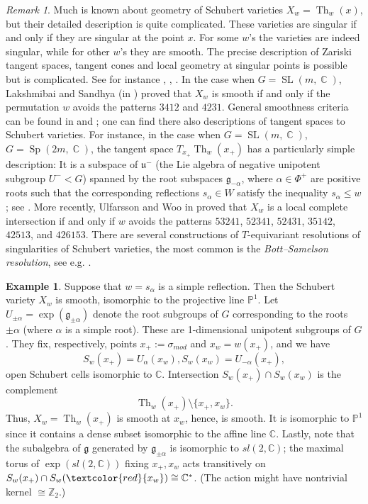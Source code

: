 \documentclass[12pt]{amsbook}%
\theoremstyle{definition}
\newtheorem{example}[thm]{Example}
\theoremstyle{remark}
\newtheorem{rem}[thm]{Remark}
\numberwithin{section}{chapter}
\numberwithin{subsection}{section}
\numberwithin{figure}{chapter}
\DeclareMathOperator{\C}{\mathbb{C}}
\DeclareMathOperator{\SL}{SL}
\DeclareMathOperator{\Sp}{Sp}
\DeclareMathOperator{\Th}{Th}
\def\simod{\sigma_{mod}}
\def\P{{\mathbb{P}}}
\begin{document}
{{\begin{rem}\label{rem:local Schubert} 
Much is known about geometry of Schubert varieties $X_w=\Th_w(x)$, but their detailed description is quite complicated. 
These varieties are singular if and only if they are singular at the point $x$. 
For some $w$'s the varieties are indeed singular, while for other $w$'s they are smooth. 
The precise description of Zariski tangent spaces, tangent cones and local geometry at singular points is possible but is complicated. See for instance \cite{BL}, \cite{CK}, \cite{Ulfarsson-Woo}. In the case when $G=\SL(m,\C)$, Lakshmibai and Sandhya (in \cite{MR1051089}) proved that $X_w$ is 
smooth if and only if the permutation $w$ avoids the patterns  $3412$ and $4231$. General smoothness criteria can be found in 
\cite{BL} and \cite{CK}; one can find there also descriptions of tangent spaces to Schubert varieties. For instance, in the case when $G=\SL(m,\C)$, 
$G=\Sp(2m,\C)$, the tangent space $T_{x_+}\Th_w(x_+)$ has a particularly simple description: It is a subspace of ${\mathfrak u}^-$ (the Lie algebra of negative unipotent subgroup $U^-< G$) spanned by the root subspaces ${\mathfrak g}_{-\alpha}$, where $\alpha\in \Phi^+$ are positive  roots such that the corresponding reflections $s_\alpha\in W$ satisfy the inequality $s_\alpha\le w$; see \cite[Theorem 5.3.1]{BL}.  More recently, Ulfarsson and Woo in \cite{Ulfarsson-Woo} 
proved that $X_w$ is a local complete intersection if and only if $w$ avoids the patterns 
$53241$, $52341$, $52431$, $35142$, $42513$, and $426153$. There are several constructions of $T$-equivariant resolutions of singularities of 
Schubert varieties, the most common is the {\em Bott--Samelson resolution}, see e.g. \cite{BL}. 
\end{rem}

\begin{example}
Suppose that $w=s_\alpha$ is a simple reflection. Then the Schubert variety $X_w$ is smooth, isomorphic to the projective line $\P^1$.  Let $U_{\pm\alpha}=\exp({\mathfrak g}_{\pm\alpha})$ denote the root subgroups  of $G$ corresponding to the roots $\pm\alpha$ (where $\alpha$ is a simple root). These are 1-dimensional unipotent subgroups of $G$. They fix, respectively, points  $x_+:=\simod$ and $x_w=w(x_{+})$, and we have 
$$
S_w(x_+)= U_{\alpha}(x_w), {S_w(x_w)}= U_{-\alpha}(x_+), 
$$
open Schubert cells isomorphic to $\mathbb C$. Intersection $S_w(x_+)\cap S_w(x_w)$ is the complement 
$$
\Th_w(x_+)\setminus \{x_+, x_w\}. 
$$
Thus, $X_w=\Th_w(x_+)$ is smooth at $x_w$, hence, is smooth. It is isomorphic to $\P^1$ since it contains a dense subset isomorphic to the affine line $\mathbb C$. Lastly, note that the subalgebra of $\mathfrak{g}$ generated by $\mathfrak{g}_{\pm\alpha}$ is isomorphic to $sl(2,\mathbb C)$; the 
maximal torus of $\exp(sl(2,\mathbb C))$ fixing $x_+, x_w$ acts transitively on $S_w(x_+)\cap S_w(\textcolor{red}{x_w})\cong \mathbb C^*$. 
(The action might have nontrivial kernel $\cong \mathbb Z_2$.) 
\end{example}



}}
\end{document}
